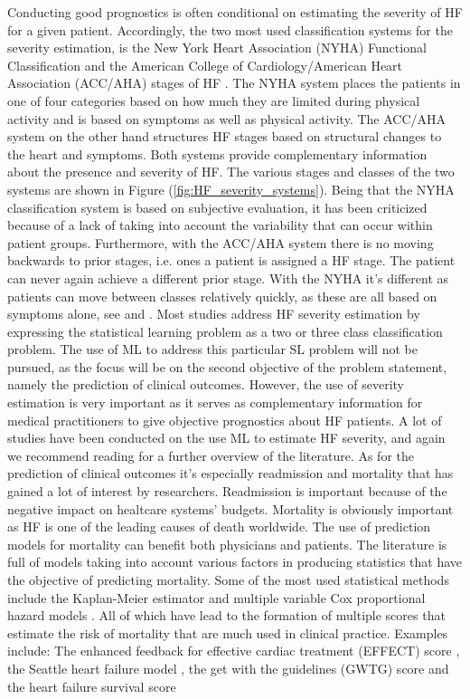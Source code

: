 \documentclass[../thesis.tex]{subfiles}
\begin{document}
\indent Conducting good prognostics is often conditional on estimating the severity of HF for a given patient. Accordingly, the two most used classification systems for the severity estimation, is the New York Heart Association (NYHA) Functional Classification \citep{new1994nomenclature} and the American College of Cardiology/American Heart Association (ACC/AHA) stages of HF \citep{hunt2001acc}. The NYHA system places the patients in one of four categories based on how much they are limited during physical activity and is based on symptoms as well as physical activity. The ACC/AHA system on the other hand structures HF stages based on structural changes to the heart and symptoms. Both systems provide complementary information about the presence and severity of HF. The various stages and classes of the two systems are shown in Figure (\ref{fig:HF_severity_systems}). Being that the NYHA classification system is based on subjective evaluation, it has been criticized because of a lack of taking into account the variability that can occur within patient groups. Furthermore, with the ACC/AHA system there is no moving backwards to prior stages, i.e. ones a patient is assigned a HF stage. The patient can never again achieve a different prior stage. With the NYHA it's different as patients can move between classes relatively quickly, as these are all based on symptoms alone, see \cite{fleg2000assessment} and \cite{yancy2013}. Most studies address HF severity estimation by expressing the statistical learning problem as a two or three class classification problem. The use of ML to address this particular SL problem will not be pursued, as the focus will be on the second objective of the problem statement, namely the prediction of clinical outcomes. However, the use of severity estimation is very important as it serves as complementary information for medical practitioners to give objective prognostics about HF patients. A lot of studies have been conducted on the use ML to estimate HF severity, and again we recommend reading \cite{tripoliti2017heart} for a further overview of the literature. As for the prediction of clinical outcomes it's especially readmission and mortality that has gained a lot of interest by researchers. Readmission is important because of the negative impact on healtcare systems' budgets. Mortality is obviously important as HF is one of the leading causes of death worldwide. The use of prediction models for mortality can benefit both physicians and patients. The literature is full of models taking into account various factors in producing statistics that have the objective of predicting mortality. Some of the most used statistical methods include the Kaplan-Meier estimator \citep{kaplan1958nonparametric} and multiple variable Cox proportional hazard models \citep{cox1972regression}. All of which have lead to the formation of multiple scores that estimate the risk of mortality that are much used in clinical practice. Examples include: The enhanced feedback for effective cardiac treatment (EFFECT) score \citep{lee2003predicting}, the Seattle heart failure model \citep{levy2006seattle}, the get with the guidelines (GWTG) score \citep{peterson2010validated} and the heart failure survival score 
\end{document}
